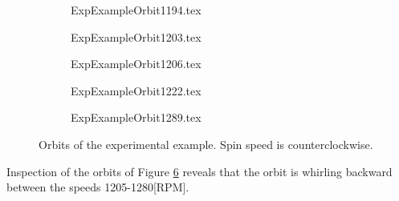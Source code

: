 \begin{figure}
\begin{subfigure}{.25\linewidth}
	\def\width{\linewidth}
	\centering
	{ExpExampleOrbit1194.tex}
	\label{fig:ExpExampleOrbit1194}
\end{subfigure}
\begin{subfigure}{.25\linewidth}
	\def\width{\linewidth}
	\centering
	{ExpExampleOrbit1203.tex}
	\label{fig:ExpExampleOrbit1203}
\end{subfigure}
\begin{subfigure}{.25\linewidth}
	\def\width{\linewidth}
	\centering
	{ExpExampleOrbit1206.tex}
	\label{fig:ExpExampleOrbit1206}
\end{subfigure}
\begin{subfigure}{.5\linewidth}
	\def\width{.45\linewidth}
	\centering
	{ExpExampleOrbit1222.tex}
	\label{fig:ExpExampleOrbit1222}
\end{subfigure}
\begin{subfigure}{.5\linewidth}
	\def\width{.5\linewidth}
	\centering
	{ExpExampleOrbit1289.tex}
	\label{fig:ExpExampleOrbit1289}
\end{subfigure}
\caption{Orbits of the experimental example. Spin speed is counterclockwise.}\label{fig:ExpExampleOrbits}
\end{figure}
Inspection of the orbits of Figure \ref{fig:ExpExampleOrbits} reveals that the orbit is whirling backward between the speeds 1205-1280[RPM].
